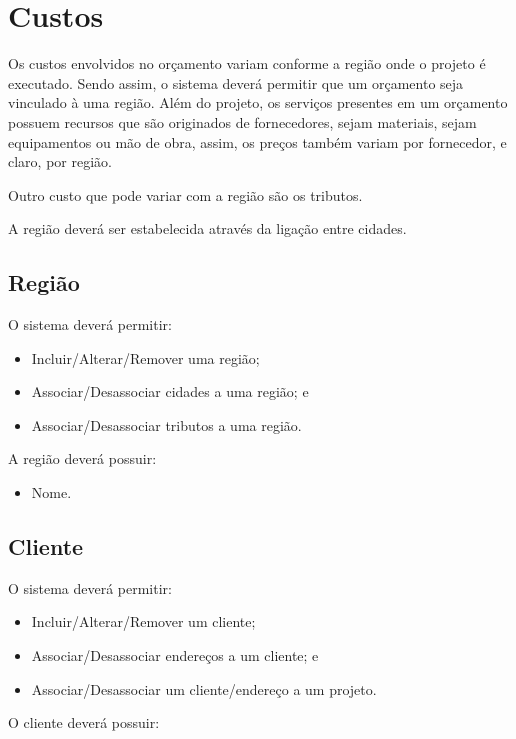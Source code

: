 \chapter{Custos}

Os custos envolvidos no orçamento variam conforme a região onde o projeto é executado. Sendo assim, o sistema deverá permitir que um orçamento seja vinculado à uma região. Além do projeto, os serviços presentes em um orçamento possuem recursos que são originados de fornecedores, sejam materiais, sejam equipamentos ou mão de obra, assim, os preços também variam por fornecedor, e claro, por região.

Outro custo que pode variar com a região são os tributos.

A região deverá ser estabelecida através da ligação entre cidades.

\section{Região}

O sistema deverá permitir:

\begin{itemize}
	\item Incluir/Alterar/Remover uma região;
	\item Associar/Desassociar cidades a uma região; e
	\item Associar/Desassociar tributos a uma região.
\end{itemize}

A região deverá possuir:

\begin{itemize}
	\item Nome.
\end{itemize}

\section{Cliente}

O sistema deverá permitir:

\begin{itemize}
	\item Incluir/Alterar/Remover um cliente;
	\item Associar/Desassociar endereços a um cliente; e
	\item Associar/Desassociar um cliente/endereço a um projeto.
\end{itemize}

O cliente deverá possuir:

